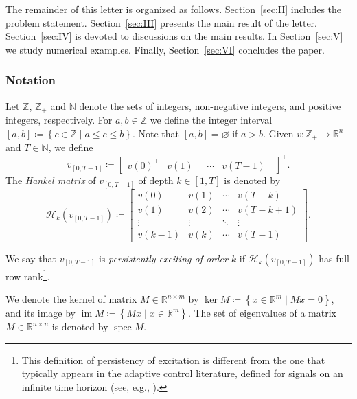\documentclass[journal,twoside,web]{ieeecolor}
\DeclareMathOperator{\im}{im}
\DeclareMathOperator{\spec}{spec}
\newcommand{\set}[2]{\left\{#1 \mid #2\right\}}
\begin{document}
The remainder of this letter is organized as follows. Section~\ref{sec:II} includes the problem statement. Section~\ref{sec:III} presents the main result of the letter. Section~\ref{sec:IV} is devoted to discussions on the main results. In Section~\ref{sec:V} we study numerical examples. Finally, Section~\ref{sec:VI} concludes the paper. 

\subsubsection*{Notation}

Let $\mathbb{Z}$, $\mathbb{Z}_+$ and $\mathbb{N}$ denote the sets of integers, non-negative integers, and positive integers, respectively. For $a,b \in \mathbb{Z}$ we define the integer interval \linebreak $[a,b] \coloneqq \set{c \in \mathbb{Z}}{a \leq c \leq b}$. Note that $[a,b]=\varnothing$ if $a>b$. Given $v:\mathbb{Z}_+\rightarrow\mathbb{R}^n$ and $T\in\mathbb{N}$, we define
\begin{equation}
v_{[0,T-1]}\coloneqq\begin{bmatrix}
v(0)^\top & v(1)^\top & \cdots & v(T-1)^\top
\end{bmatrix}^\top.
\end{equation}
The \emph{Hankel matrix} of $v_{[0,T-1]}$ of depth $k\in[1,T]$ is denoted by
\begin{equation}
\mathcal{H}_k(v_{[0,T-1]})\coloneqq \begin{bmatrix}
v(0) & v(1) & \cdots & v(T-k) \\
v(1) & v(2) & \cdots & v(T-k+1) \\
\vdots & \vdots & \ddots & \vdots \\
v(k-1) & v(k) & \cdots & v(T-1)
\end{bmatrix}.
\end{equation}

We say that $v_{[0,T-1]}$ is \emph{persistently exciting of order $k$} if $\mathcal{H}_k(v_{[0,T-1]})$ has full row rank\footnote{This definition of persistency of excitation is different from the one that typically appears in the adaptive control literature, defined for signals on an infinite time horizon (see, e.g., \cite[Def. 3.6.1]{mareels1996adaptive}).}.

We denote the kernel of matrix $M\in\mathbb{R}^{n\times m}$ by $\ker M\coloneqq \set{x\in\mathbb{R}^m}{Mx=0}$, and its image by \mbox{$\im M\coloneqq \set{Mx}{x\in\mathbb{R}^m}$}. The set of eigenvalues of a matrix $M\in\mathbb{R}^{n\times n}$ is denoted by $\spec M$. 
\end{document}
